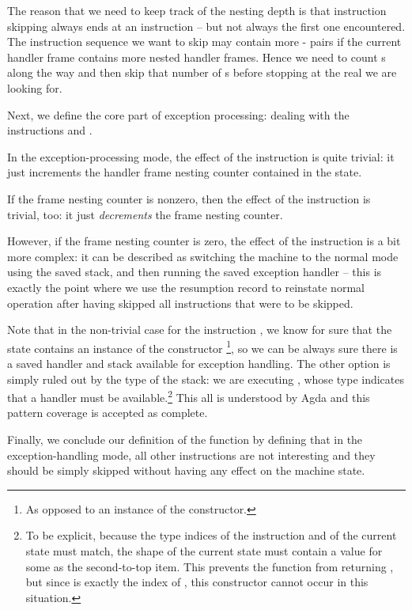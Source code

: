 The reason that we need to keep track of the nesting depth is that instruction
skipping always ends at an  instruction -- but not always the
first one encountered. The instruction sequence we want to skip may contain
more - pairs if the current handler frame contains
more nested handler frames. Hence we need to count s along the way
and then skip that number of s before stopping at the real
 we are looking for.

Next, we define the core part of exception processing: dealing with the
instructions  and .

In the exception-processing mode, the effect of the instruction  is
quite trivial: it just increments the handler frame nesting counter contained
in the state.

If the frame nesting counter is nonzero, then the effect of the instruction
 is trivial, too: it just \emph{decrements} the frame nesting
counter.

However, if the frame nesting counter is zero, the effect of the instruction
 is a bit more complex: it can be described as switching the
machine to the normal mode using the saved stack, and then running the saved
exception handler -- this is exactly the point where we use the resumption
record to reinstate normal operation after having skipped all instructions that
were to be skipped.

Note that in the non-trivial case for the instruction , we know
for sure that the state contains an instance of the  constructor%
\footnote{As opposed to an instance of the  constructor.}, so
we can be always sure there is a saved handler and stack available for
exception handling. The other option is simply ruled out by the type of the
stack: we are executing , whose type indicates that a handler
must be available.\footnote{To be explicit, because the type indices of the
	instruction  and of the current state must match, the shape
	of the current state must contain a value  for some 
	as the second-to-top item.  This prevents the function 
from returning , but since  is exactly the index
of , this constructor cannot occur in this situation.} This all
is understood by Agda and this pattern coverage is accepted as complete.

Finally, we conclude our definition of the function  by
defining that in the exception-handling mode, all other instructions are not
interesting and they should be simply skipped without having any effect on the
machine state.

